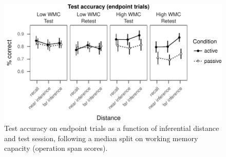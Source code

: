 \documentclass[floatsintext,man]{apa6}
\theoremstyle{definition}
\theoremstyle{definition}
\theoremstyle{definition}
\theoremstyle{remark}
\begin{document}
\begin{figure}
\centering
\includegraphics{active_transitive_inference_files/figure-latex/unnamed-chunk-6-1.pdf}
\caption{\label{fig:unnamed-chunk-6}Test accuracy on endpoint trials as a
function of inferential distance and test session, following a median
split on working memory capacity (operation span scores).
\label{fig_acc_endpoint}}
\end{figure}
\end{document}
